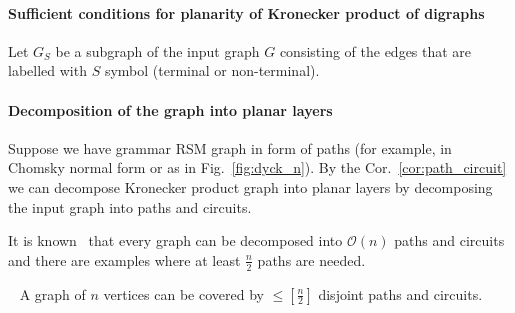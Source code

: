 \paragraph{Sufficient conditions for planarity of Kronecker product of digraphs}

Let $G_S$ be a subgraph of the input graph $G$ consisting of the edges that are labelled with $S$ symbol (terminal or non-terminal).




\paragraph{Decomposition of the graph into planar layers}

Suppose we have grammar RSM graph in form of paths (for example, in Chomsky normal form or as in Fig.~\ref{fig:dyck_n}). By the Cor.~\ref{cor:path_circuit} we can decompose Kronecker product graph into planar layers by decomposing the input graph into paths and circuits.



It is known~\cite{lovasz1968covering} that every graph can be decomposed into $\mathcal{O}(n)$ paths and circuits and there are examples where at least $\frac{n}{2}$ paths are needed.

\begin{theorem}~\cite{lovasz1968covering}
A graph of $n$ vertices can be covered by $\leq \left[ \frac{n}{2} \right]$ disjoint paths and circuits.
\end{theorem}

